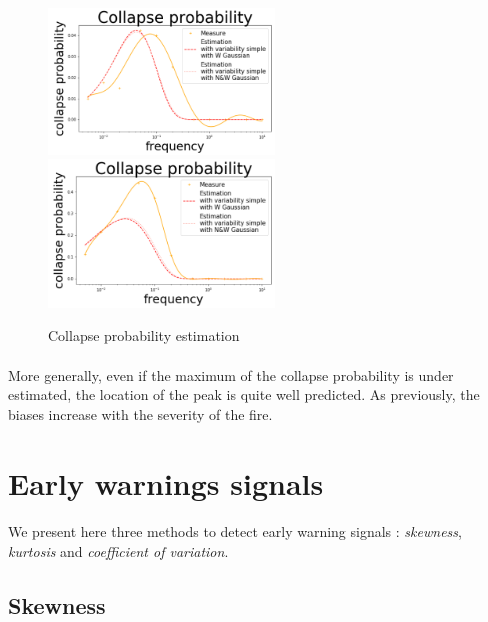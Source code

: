 \documentclass{article}
\begin{document}
\begin{figure}[h!]
\includegraphics[width=6cm]{cp_gauss_1.png}
\includegraphics[width=6cm]{cp_gauss_2.png}
\caption{Collapse probability estimation}
\end{figure}


\paragraph{}
More generally, even if the maximum of the collapse probability is under estimated, the location of the peak is quite well predicted. As previously, the biases increase with the severity of the fire.


\section{Early warnings signals}
\label{stability_others}

\paragraph{}
We present here three methods to detect early warning signals : \textit{skewness}, \textit{kurtosis} and \textit{coefficient of variation}.


\subsection{Skewness}
\end{document}
